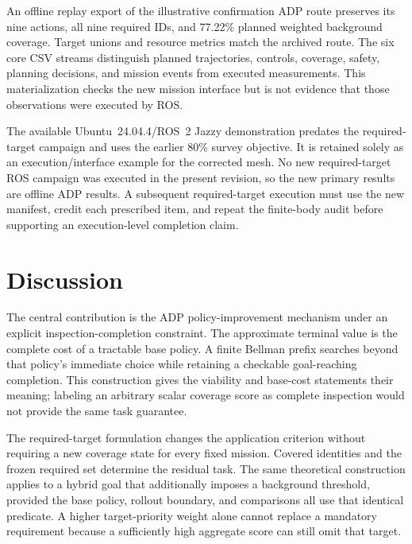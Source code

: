 An offline replay export of the illustrative confirmation ADP route preserves its nine actions, all nine required IDs, and 77.22\% planned weighted background coverage. Target unions and resource metrics match the archived route. The six core CSV streams distinguish planned trajectories, controls, coverage, safety, planning decisions, and mission events from executed measurements. This materialization checks the new mission interface but is not evidence that those observations were executed by ROS.

The available Ubuntu~24.04.4/ROS~2 Jazzy demonstration predates the required-target campaign and uses the earlier 80\% survey objective. It is retained solely as an execution/interface example for the corrected mesh. No new required-target ROS campaign was executed in the present revision, so the new primary results are offline ADP results. A subsequent required-target execution must use the new manifest, credit each prescribed item, and repeat the finite-body audit before supporting an execution-level completion claim.

\ifincludeROSVerificationResults
  
\fi

\section{Discussion}
\label{sec:discussion}

The central contribution is the ADP policy-improvement mechanism under an explicit inspection-completion constraint. The approximate terminal value is the complete cost of a tractable base policy. A finite Bellman prefix searches beyond that policy's immediate choice while retaining a checkable goal-reaching completion. This construction gives the viability and base-cost statements their meaning; labeling an arbitrary scalar coverage score as complete inspection would not provide the same task guarantee.

The required-target formulation changes the application criterion without requiring a new coverage state for every fixed mission. Covered identities and the frozen required set determine the residual task. The same theoretical construction applies to a hybrid goal that additionally imposes a background threshold, provided the base policy, rollout boundary, and comparisons all use that identical predicate. A higher target-priority weight alone cannot replace a mandatory requirement because a sufficiently high aggregate score can still omit that target.

